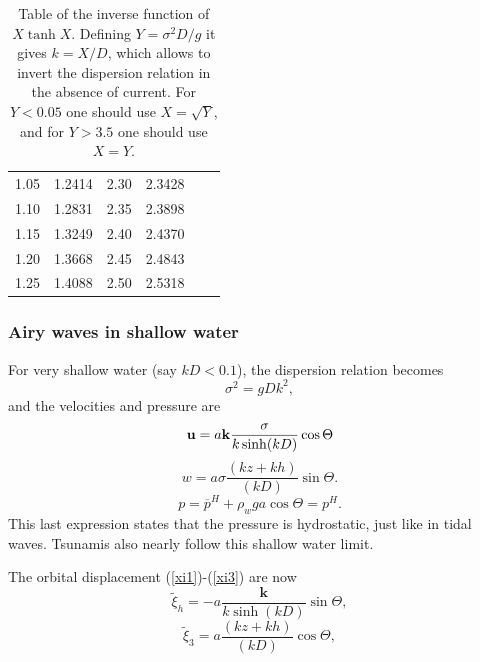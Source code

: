 \begin{table}
\begin{tabular}{cccccc}
       1.05    &     1.2414   &     2.30 & 2.3428 &   &     \\
       1.10    &     1.2831   &     2.35 & 2.3898 &   &     \\
       1.15    &     1.3249   &     2.40 & 2.4370 &   &     \\
       1.20    &     1.3668   &     2.45 & 2.4843 &   &     \\
       1.25    &     1.4088   &     2.50 & 2.5318 &   &     \\
    \hline                  
\hline
\end{tabular}
  \caption{Table of the inverse function of $X \tanh X$. Defining $Y=\sigma^2 D/g$ it gives $k=X/D$, 
which allows to invert the dispersion relation in the absence of current. 
For $Y< 0.05$ one should use $X=\sqrt{Y}$, and for $Y >3.5$ one should use $X=Y$.}\label{table_dispersion}
\end{table}


\subsubsection{Airy waves in shallow water}
For very shallow water  (say $kD < 0.1$), the dispersion relation 
becomes
\begin{equation}
    \sigma^2=g D  k^2,
     \label{dispersion shallow}
\end{equation}
and the velocities and pressure are 
\begin{equation}
    \mathbf{u}=a{\mathbf k}\frac{\sigma}{k \sinh(k D)}
        \cos \Theta
\end{equation}
\begin{equation}
    w=a \sigma
    \frac{\left(kz+kh\right)}{\left(kD\right)}    \sin \Theta.
\end{equation}
\begin{equation}
    p=\overline{p}^H+ \rho_w g a     \cos \Theta = p^H.
\end{equation}
This last expression states that the pressure is hydrostatic, just like in 
tidal waves. Tsunamis also nearly follow this shallow water limit. 

 The orbital displacement (\ref{xi1})-(\ref{xi3})
are now
\begin{equation}
    \widetilde{\xi}_h=-a \frac{\mathbf k}{k \sinh(k D)}
    \sin \Theta,
\end{equation}
\begin{equation}
    \widetilde{\xi}_3= a \frac{\left(kz+kh\right)}{\left(kD\right)}  \cos \Theta,
\end{equation}

